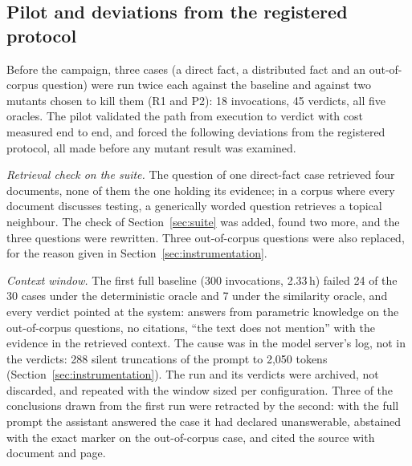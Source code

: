 \documentclass[a4paper,fleqn]{cas-dc}
\begin{document}
\subsection{Pilot and deviations from the registered protocol}
\label{sec:pilot}

Before the campaign, three cases (a direct fact, a distributed fact and an
out-of-corpus question) were run twice each against the baseline and against
two mutants chosen to kill them (R1 and P2): 18 invocations, 45 verdicts,
all five oracles. The pilot validated the path from execution to verdict with
cost measured end to end, and forced the following deviations from the
registered protocol, all made before any mutant result was examined.

\emph{Retrieval check on the suite.} The question of one direct-fact case
retrieved four documents, none of them the one holding its evidence; in a
corpus where every document discusses testing, a generically worded question
retrieves a topical neighbour. The check of Section~\ref{sec:suite} was added,
found two more, and the three questions were rewritten. Three out-of-corpus
questions were also replaced, for the reason given in
Section~\ref{sec:instrumentation}.

\emph{Context window.} The first full baseline (300 invocations, 2.33\,h)
failed 24 of the 30 cases under the deterministic oracle and 7 under the
similarity oracle, and every verdict pointed at the system: answers from
parametric knowledge on the out-of-corpus questions, no citations, ``the
text does not mention'' with the evidence in the retrieved context. The cause
was in the model server's log, not in the verdicts: 288 silent truncations of
the prompt to 2,050 tokens (Section~\ref{sec:instrumentation}). The run and
its verdicts were archived, not discarded, and repeated with the window sized
per configuration. Three of the conclusions drawn from the first run were
retracted by the second: with the full prompt the assistant answered the case
it had declared unanswerable, abstained with the exact marker on the
out-of-corpus case, and cited the source with document and page.
\end{document}
